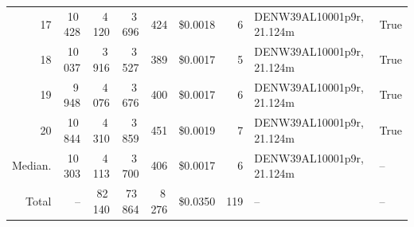\documentclass[a4paper,11pt]{article}
\begin{document}
\begin{table}[ht]
\begin{tabular}{r r r r r r r p{3cm} l}
17 & 10\,428 & 4\,120 & 3\,696 & 424 & \$0.0018 & 6 & DENW39AL10001p9r, 21.124m & True \\
18 & 10\,037 & 3\,916 & 3\,527 & 389 & \$0.0017 & 5 & DENW39AL10001p9r, 21.124m & True \\
19 & 9\,948 & 4\,076 & 3\,676 & 400 & \$0.0017 & 6 & DENW39AL10001p9r, 21.124m & True \\
20 & 10\,844 & 4\,310 & 3\,859 & 451 & \$0.0019 & 7 & DENW39AL10001p9r, 21.124m & True \\
\hline
Median. & 10\,303 & 4\,113 & 3\,700 & 406 & \$0.0017 & 6 & DENW39AL10001p9r, 21.124m & -- \\
Total & -- & 82\,140 & 73\,864 & 8\,276 & \$0.0350 & 119 & -- & -- \\
\hline
\end{tabular}
\end{table}

\clearpage
\end{document}
